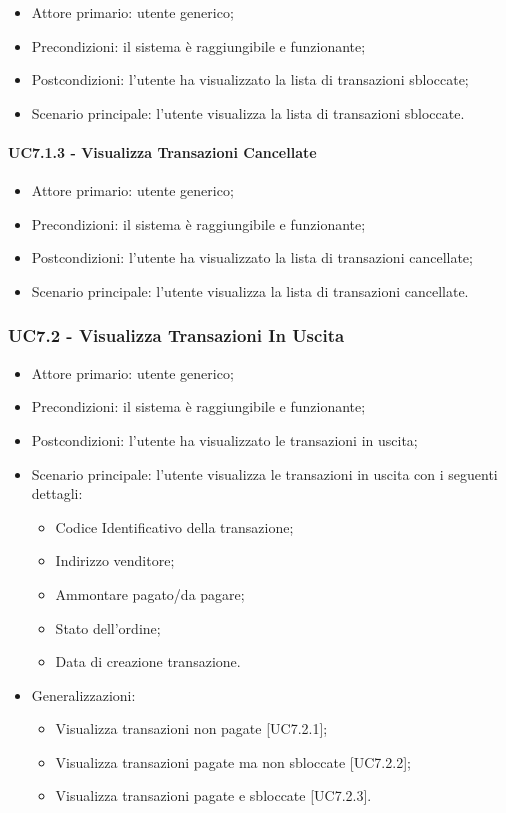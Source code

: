 \begin{itemize}
    \item Attore primario: utente generico;
    \item Precondizioni: il sistema è raggiungibile e funzionante;
    \item Postcondizioni: l'utente ha visualizzato la lista di transazioni sbloccate;
    \item Scenario principale: l'utente visualizza la lista di transazioni sbloccate.
\end{itemize}

\paragraph{UC7.1.3 - Visualizza Transazioni Cancellate}

\begin{itemize}
    \item Attore primario: utente generico;
    \item Precondizioni: il sistema è raggiungibile e funzionante;
    \item Postcondizioni: l'utente ha visualizzato la lista di transazioni cancellate;
    \item Scenario principale: l'utente visualizza la lista di transazioni cancellate.
\end{itemize}

\subsubsection{UC7.2 - Visualizza Transazioni In Uscita}

\begin{itemize}
    \item Attore primario: utente generico;
    \item Precondizioni: il sistema è raggiungibile e funzionante;
    \item Postcondizioni: l'utente ha visualizzato le transazioni in uscita;
    \item Scenario principale: l'utente visualizza le transazioni in uscita con i seguenti dettagli:
        \begin{itemize}
            \item Codice Identificativo della transazione;
            \item Indirizzo venditore;
            \item Ammontare pagato/da pagare;
            \item Stato dell'ordine;
            \item Data di creazione transazione.
        \end{itemize}
    \item Generalizzazioni:
        \begin{itemize}
            \item Visualizza transazioni non pagate [UC7.2.1];
            \item Visualizza transazioni pagate ma non sbloccate [UC7.2.2];
            \item Visualizza transazioni pagate e sbloccate [UC7.2.3].
        \end{itemize}
\end{itemize}

